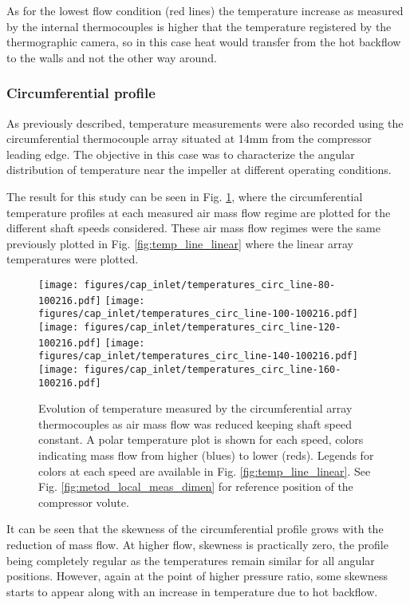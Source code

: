 As for the lowest flow condition (red lines) the temperature increase as measured by the internal thermocouples is higher that the temperature registered by the thermographic camera, so in this case heat would transfer from the hot backflow to the walls and not the other way around.

\subsubsection{Circumferential profile}

As previously described, temperature measurements were also recorded using the circumferential thermocouple array situated at 14mm from the compressor leading edge. The objective in this case was to characterize the angular distribution of temperature near the impeller at different operating conditions.

The result for this study can be seen in Fig. \ref{fig:temp_circ_all}, where the circumferential temperature profiles at each measured air mass flow regime are plotted for the different shaft speeds considered. These air mass flow regimes were the same previously plotted in Fig. \ref{fig:temp_line_linear} where the linear array temperatures were plotted.

\begin{figure}[t!]
\centering
\texttt{[image: figures/cap\_inlet/temperatures\_circ\_line-80-100216.pdf]}
\texttt{[image: figures/cap\_inlet/temperatures\_circ\_line-100-100216.pdf]}
\texttt{[image: figures/cap\_inlet/temperatures\_circ\_line-120-100216.pdf]}
\texttt{[image: figures/cap\_inlet/temperatures\_circ\_line-140-100216.pdf]}
\texttt{[image: figures/cap\_inlet/temperatures\_circ\_line-160-100216.pdf]}
\caption{Evolution of temperature measured by the circumferential array thermocouples as air mass flow was reduced keeping shaft speed constant. A polar temperature plot is shown for each speed, colors indicating mass flow from higher (blues) to lower (reds). Legends for colors at each speed are available in Fig. \ref{fig:temp_line_linear}. See Fig. \ref{fig:metod_local_meas_dimen} for reference position of the compressor volute.}
\label{fig:temp_circ_all}
\end{figure}

It can be seen that the skewness of the circumferential profile grows with the reduction of mass flow. At higher flow, skewness is practically zero, the profile being completely regular as the temperatures remain similar for all angular positions. However, again at the point of higher pressure ratio, some skewness starts to appear along with an increase in temperature due to hot backflow.

